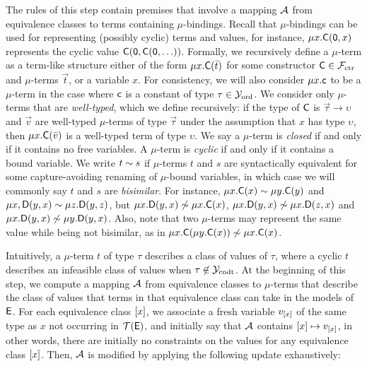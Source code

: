The rules of this step contain premises that involve a mapping $\mathcal{A}$ from equivalence classes to terms containing $\mu$-bindings.
Recall that $\mu$-bindings can be used for representing (possibly cyclic) terms and values,
for instance, $\mu x. \textsf{C}( \textsf{0}, x )$ represents the cyclic value $\textsf{C}( \textsf{0}, \textsf{C}( \textsf{0}, \ldots ))$.
Formally, we recursively define a $\mu$-term as a term-like structure either of the form
$\mu x. \textsf{C}( \bar t )$ for some constructor $\textsf{C} \in \mathcal{F}_{\mathrm{ctr}}$ and $\mu$-terms $\vec t$, 
or a variable $x$.
For consistency, we will also consider $\mu x. \textsf{c}$ to be a $\mu$-term
in the case where $\textsf{c}$ is a constant of type $\tau \in \mathcal{Y}_{\mathrm{ord}}$.
We consider only $\mu$-terms that are \emph{well-typed}, which we define recursively:
if the type of $\textsf{C}$ is $\vec \tau \rightarrow \upsilon$
and $\vec v$ are well-typed $\mu$-terms of type $\vec \tau$ under the assumption that $x$ has type $\upsilon$,
then $\mu x. \textsf{C}( \bar v )$ is a well-typed term of type $\upsilon$.
We say a $\mu$-term is \emph{closed} if and only if it contains no free variables.
A $\mu$-term is \emph{cyclic} if and only if it contains a bound variable.
We write $t \sim s$ if $\mu$-terms $t$ and $s$ are syntactically equivalent for some capture-avoiding renaming of $\mu$-bound variables,
in which case we will commonly say $t$ and $s$ are \emph{bisimilar}.
For instance, 
$\mu x. \textsf{C}( x ) \sim \mu y. \textsf{C}( y )$ and
$\mu x, \textsf{D}( y, x ) \sim \mu z. \textsf{D}( y, z )$, but
$\mu x. \textsf{D}( y, x ) \not\sim \mu x. \textsf{C}( x )$,
$\mu x. \textsf{D}( y, x ) \not\sim \mu x. \textsf{D}( z, x )$ and
$\mu x. \textsf{D}( y, x ) \not\sim \mu y. \textsf{D}( y, x )$.
Also, note that
two $\mu$-terms may represent the same value while being not bisimilar, as in
$\mu x. \textsf{C}( \mu y. \textsf{C}( x ) ) \not\sim \mu x. \textsf{C}( x )$.

Intuitively, a $\mu$-term $t$ of type $\tau$ describes a class of values of $\tau$, 
where a cyclic $t$ describes an infeasible class of values when $\tau \not\in \mathcal{Y}_{\mathrm{codt}}$.
At the beginning of this step, 
we compute a mapping $\mathcal{A}$ from equivalence classes to $\mu$-terms 
that describe the class of values that terms in that equivalence class can take in the models of $\mathsf{E}$. 
For each equivalence class $[ x ]$, we associate a fresh variable $v_{[ x ]}$ of the same type as $x$ not occurring in $\mathcal{T}(\mathsf{E})$,
and initially say that $\mathcal{A}$ contains $[ x ] \mapsto v_{[ x ]}$,
in other words, there are initially no constraints on the values for any equivalence class $[ x ]$.
Then, $\mathcal{A}$ is modified by applying the following update exhaustively:

